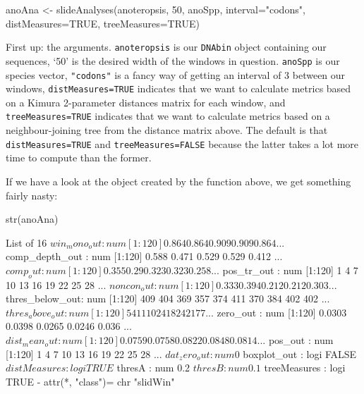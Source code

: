 \documentclass{article}
\newcommand{\fun}[1]{\texttt{#1}}
\begin{document}
\begin{console}
anoAna <- slideAnalyses(anoteropsis, 50, anoSpp, interval="codons", 
distMeasures=TRUE, treeMeasures=TRUE)
\end{console}

First up: the arguments. \fun{anoteropsis} is our \fun{DNAbin} object containing our sequences, `50' is the desired width of the windows in question. \fun{anoSpp} is our species vector, \fun{"codons"} is a fancy way of getting an interval of 3 between our windows, \fun{distMeasures=TRUE} indicates that we want to calculate metrics based on a Kimura 2-parameter distances matrix for each window, and \fun{treeMeasures=TRUE} indicates that we want to calculate metrics based on a neighbour-joining tree from the distance matrix above. The default is that \fun{distMeasures=TRUE} and \fun{treeMeasures=FALSE} because the latter takes a lot more time to compute than the former. 

If we have a look at the object created by the function above, we get something fairly nasty:

\begin{console}
str(anoAna)
\end{console}

\begin{Routput}
List of 16
 $ win_mono_out   : num [1:120] 0.864 0.864 0.909 0.909 0.864 ...
 $ comp_depth_out : num [1:120] 0.588 0.471 0.529 0.529 0.412 ...
 $ comp_out       : num [1:120] 0.355 0.29 0.323 0.323 0.258 ...
 $ pos_tr_out     : num [1:120] 1 4 7 10 13 16 19 22 25 28 ...
 $ noncon_out     : num [1:120] 0.333 0.394 0.212 0.212 0.303 ...
 $ thres_below_out: num [1:120] 409 404 369 357 374 411 370 384 402 402 ...
 $ thres_above_out: num [1:120] 5 4 11 10 24 18 24 21 7 7 ...
 $ zero_out       : num [1:120] 0.0303 0.0398 0.0265 0.0246 0.036 ...
 $ dist_mean_out  : num [1:120] 0.0759 0.0758 0.0822 0.0848 0.0814 ...
 $ pos_out        : num [1:120] 1 4 7 10 13 16 19 22 25 28 ...
 $ dat_zero_out   : num 0
 $ boxplot_out    : logi FALSE
 $ distMeasures   : logi TRUE
 $ thresA         : num 0.2
 $ thresB         : num 0.1
 $ treeMeasures   : logi TRUE
 - attr(*, "class")= chr "slidWin"
\end{Routput}
\end{document}
